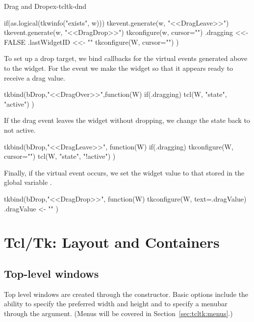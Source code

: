 \begin{example}{Drag and Drop}{ex-tcltk-dnd}
\begin{Schunk}
\begin{Sinput}
{   if(as.logical(tkwinfo("exists", w))) {
     tkevent.generate(w, "<<DragLeave>>")
     tkevent.generate(w, "<<DragDrop>>")
     tkconfigure(w, cursor="")
   }
   .dragging <<- FALSE
   .lastWidgetID <<- "" 
   tkconfigure(W, cursor="")
 })
\end{Sinput}
\end{Schunk}
%
%
To set up a drop target, we bind callbacks for the virtual events
generated above to the widget. For the  event
we make the widget  so that it appears ready to receive a
drag value.
\begin{Schunk}
\begin{Sinput}
 tkbind(bDrop,"<<DragOver>>",function(W) {
   if(.dragging) 
     tcl(W, "state", "active")
 })
\end{Sinput}
\end{Schunk}
%
If the drag event leaves the widget without dropping, we change the
state back to not active.
\begin{Schunk}
\begin{Sinput}
 tkbind(bDrop,"<<DragLeave>>", function(W) {
   if(.dragging)  {
     tkconfigure(W, cursor="")
     tcl(W, "state", "!active")  
    }
 })
\end{Sinput}
\end{Schunk}
%
Finally, if the  virtual event occurs, we set
the widget value to that stored in the global variable
.
\begin{Schunk}
\begin{Sinput}
 tkbind(bDrop,"<<DragDrop>>", function(W) {
   tkconfigure(W, text=.dragValue)
   .dragValue <- ""
 })
\end{Sinput}
\end{Schunk}
\end{example}





\chapter{Tcl/Tk: Layout and Containers}
\label{sec:tcltk:basic-containers}


\section{Top-level windows}
\label{sec:tcltk:top-level-windows}

Top level windows are created through the 
constructor. Basic options include the ability to specify the
preferred width and height and to specify a menubar through
the  argument. (Menus will be covered in
Section~\ref{sec:tcltk:menus}.)


